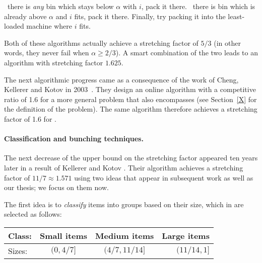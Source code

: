 \begin{algorithm}
\caption{}
\begin{algorithmic}[1]
\State \algorithmicif\ there is \emph{any} bin which stays below $\alpha$ with $i$, pack it there.
\State \algorithmicif\ there is bin which is already above $\alpha$ and $i$ fits, pack it there.
\State Finally, try packing it into the least-loaded machine where $i$ fits.
\EndFor 
\end{algorithmic}
\end{algorithm}

Both of these algorithms actually achieve a stretching factor of $5/3$
(in other words, they never fail when $\alpha \ge 2/3$). A smart
combination of the two leads to an algorithm with stretching factor
$1.625$.


The next algorithmic progress came as a consequence of the work of
Cheng, Kellerer and Kotov in 2003~\cite{cheng2003}. They design an
online algorithm with a competitive ratio of 1.6 for a more general
problem that also encompasses \binstretch (see Section~\ref{X} for the
definition of the problem). The same algorithm therefore achieves a
stretching factor of 1.6 for \binstretch.

\paragraph{Classification and bunching techniques.} The next decrease
of the upper bound on the stretching factor appeared ten years later
in a result of Kellerer and Kotov \cite{kellerer2013}. Their algorithm
achieves a stretching factor of $11/7 \approx 1.571$ using two ideas
that appear in subsequent work as well as our thesis; we focus on them
now.


The first idea is to \emph{classify} items into groups based on their
size, which in \cite{kellerer2013} are selected as follows:

\begin{center}
  \begin{tabular}{ l | c | c | r }
    Class: & Small items & Medium items   & Large items \\ \hline
    Sizes: & $(0,4/7]$   & $(4/7, 11/14]$ & $(11/14,1]$ \\ 
  \end{tabular}
\end{center}

